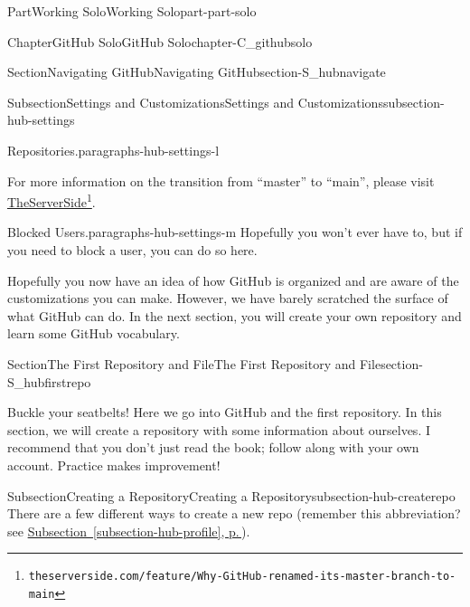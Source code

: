 \documentclass[twoside,10pt,]{book}
\newcommand{\xreffont}{\relax}
\begin{document}
\begin{partptx}{Part}{Working Solo}{}{Working Solo}{}{}{part-part-solo}
\begin{chapterptx}{Chapter}{GitHub Solo}{}{GitHub Solo}{}{}{chapter-C_githubsolo}
\begin{sectionptx}{Section}{Navigating GitHub}{}{Navigating GitHub}{}{}{section-S_hubnavigate}
\begin{subsectionptx}{Subsection}{Settings and Customizations}{}{Settings and Customizations}{}{}{subsection-hub-settings}
\begin{paragraphs}{Repositories.}{paragraphs-hub-settings-l}
\par
For more information on the transition from ``master'' to ``main'', please visit \href{https://www.theserverside.com/feature/Why-GitHub-renamed-its-master-branch-to-main}{TheServerSide}\footnote{\nolinkurl{theserverside.com/feature/Why-GitHub-renamed-its-master-branch-to-main}\label{fn-hub-settings-l-e-d}}.%
\end{paragraphs}%
\begin{paragraphs}{Blocked Users.}{paragraphs-hub-settings-m}%
%
Hopefully you won't ever have to, but if you need to block a user, you can do so here.%
\end{paragraphs}%
\end{subsectionptx}
\begin{conclusion}{}%
Hopefully you now have an idea of how GitHub is organized and are aware of the customizations you can make. However, we have barely scratched the surface of what GitHub can do. In the next section, you will create your own repository and learn some GitHub vocabulary.%
\end{conclusion}%
\end{sectionptx}
%
%
\typeout{************************************************}
\typeout{************************************************}
%
\begin{sectionptx}{Section}{The First Repository and File}{}{The First Repository and File}{}{}{section-S_hubfirstrepo}
%
%
\begin{introduction}{}%
Buckle your seatbelts! Here we go into GitHub and the first repository. In this section, we will create a repository with some information about ourselves. I recommend that you don't just read the book; follow along with your own account. Practice makes improvement!%
\end{introduction}%
%
%
\typeout{************************************************}
\typeout{************************************************}
%
\begin{subsectionptx}{Subsection}{Creating a Repository}{}{Creating a Repository}{}{}{subsection-hub-createrepo}
%
There are a few different ways to create a new repo (remember this abbreviation? see \hyperref[subsection-hub-profile]{Subsection~{\xreffont\ref{subsection-hub-profile}}, p.\,\pageref{subsection-hub-profile}}).%
\begin{enumerate}

\end{enumerate}
\end{subsectionptx}
\end{sectionptx}
\end{chapterptx}
\end{partptx}
\end{document}
